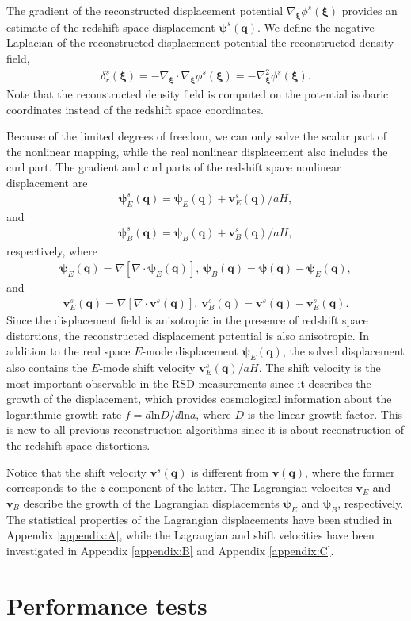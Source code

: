 \documentclass[aps,prx,twocolumn,superscriptaddress,groupedaddress,nofootinbib,amsfont]{revtex4}  %
\newcommand{\mr}{\mathrm}
\newcommand{\bea}{\begin{eqnarray}}
\newcommand{\eea}{\end{eqnarray}}
\newcommand{\bmp}{\bm{\psi}}
\newcommand{\bmv}{\bm{v}}
\newcommand{\bmq}{\bm{q}}
\newcommand{\bmxi}{\bm{\xi}}
\begin{document}
The gradient of the reconstructed  displacement potential $\nabla_{\bmxi}\phi^s(\bmxi)$ provides an estimate of the redshift space displacement $\bmp^s(\bmq)$.
We define the negative Laplacian of the reconstructed displacement potential 
the reconstructed density field,
\bea
\label{eq:density}
\delta_r^s(\bmxi)=-\nabla_{\bmxi}\cdot\nabla_{\bmxi}\phi^s(\bmxi)=-\nabla^2_{\bmxi}\phi^s(\bmxi).
\eea
Note that the reconstructed density field is computed on the potential isobaric
coordinates instead of the redshift space coordinates.

Because of the limited degrees of freedom, we can only solve the scalar part 
of the nonlinear mapping, while the real nonlinear displacement also includes 
the curl part. 
The gradient and curl parts of the redshift space nonlinear displacement are
\bea
\bmp^s_E(\bmq)=\bmp_E(\bmq)+{\bmv^s_E(\bmq)}/{aH},
\eea
and
\bea
\bmp^s_B(\bmq)=\bmp_B(\bmq)+{\bmv^s_B(\bmq)}/{aH},
\eea
respectively, where 
\bea
\bmp_E(\bmq)=\nabla[\nabla\cdot\bmp_E(\bmq)],\ \bmp_B(\bmq)=\bmp(\bmq)-\bmp_E(\bmq),
\eea
and 
\bea
\bmv^s_E(\bmq)=\nabla[\nabla\cdot\bmv^s(\bmq)],\ \bmv_B^s(\bmq)=\bmv^s(\bmq)-\bmv^s_E(\bmq).
\eea
Since the displacement field is anisotropic in the presence of redshift space
distortions, the reconstructed displacement potential is also anisotropic.
In addition to the real space $E$-mode displacement $\bmp_E(\bmq)$, the solved
displacement also contains the $E$-mode shift velocity $\bmv_E^s(\bmq)/aH$.
The shift velocity is the most important observable in the RSD measurements 
since it describes the growth of the displacement, which provides cosmological 
information about the logarithmic growth rate $f=d\mr{ln}D/d\mr{ln}a$, where
$D$ is the linear growth factor.
This is new to all previous reconstruction algorithms since it is about  
reconstruction of the redshift space distortions.

Notice that the shift velocity $\bmv^s(\bmq)$ is different from $\bmv(\bmq)$, 
where the former corresponds to the $z$-component of the latter.
The Lagrangian velocites $\bmv_{E}$ and $\bmv_{B}$ describe the growth of the 
Lagrangian displacements $\bmp_{E}$ and $\bmp_{B}$, respectively. 
The statistical properties of the Lagrangian displacements have been studied in
Appendix \ref{appendix:A}, while the Lagrangian and shift velocities have been
investigated in Appendix \ref{appendix:B} and Appendix \ref{appendix:C}.


\section{Performance tests}
\label{sec:prf}
\end{document}
